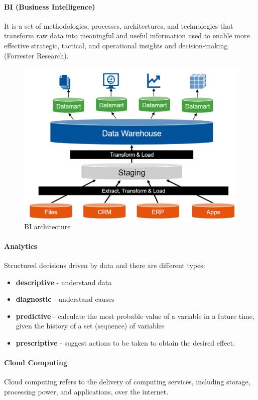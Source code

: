 \paragraph{BI (Business Intelligence)}
It is a set of methodologies, processes, architectures, and technologies that transform raw data into meaningful and useful information used to enable more effective strategic, tactical, and operational insights and decision-making (Forrester Research).
\begin{figure}[ht!]
    \centering
    \includegraphics[scale=0.6]{images/BI_architecture.png}
    \caption{BI architecture}
    \label{figBI}
\end{figure}

\paragraph{Analytics}
Structured decisions driven by data and there are different types:
\begin{itemize}
    \item \textbf{descriptive} - understand data 
    \item \textbf{diagnostic} - understand causes
    \item \textbf{predictive} - calculate the most probable value of a variable in a future time, given the history of a set (sequence) of variables
    \item \textbf{prescriptive} - suggest actions to be taken to obtain the desired effect.
\end{itemize}

\paragraph{Cloud Computing}
Cloud computing refers to the delivery of computing services, including storage, processing power, and applications, over the internet.

